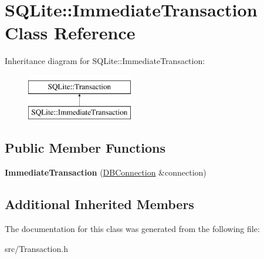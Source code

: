 \hypertarget{class_s_q_lite_1_1_immediate_transaction}{\section{S\-Q\-Lite\-:\-:Immediate\-Transaction Class Reference}
\label{class_s_q_lite_1_1_immediate_transaction}
}
Inheritance diagram for S\-Q\-Lite\-:\-:Immediate\-Transaction\-:\begin{figure}[H]
\begin{center}
\leavevmode
\includegraphics[height=2.000000cm]{class_s_q_lite_1_1_immediate_transaction}
\end{center}
\end{figure}
\subsection*{Public Member Functions}
\begin{DoxyCompactItemize}
\item 
\hypertarget{class_s_q_lite_1_1_immediate_transaction_a3c6f88a4f4f6b299461c4a30a79b17e1}{{\bfseries Immediate\-Transaction} (\hyperlink{class_s_q_lite_1_1_d_b_connection}{D\-B\-Connection} \&connection)}\label{class_s_q_lite_1_1_immediate_transaction_a3c6f88a4f4f6b299461c4a30a79b17e1}

\end{DoxyCompactItemize}
\subsection*{Additional Inherited Members}


The documentation for this class was generated from the following file\-:\begin{DoxyCompactItemize}
\item 
src/Transaction.\-h\end{DoxyCompactItemize}
